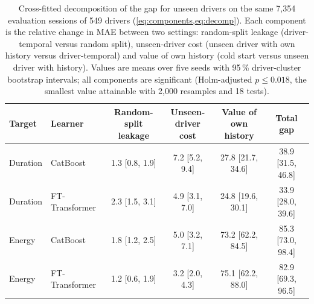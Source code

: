 \begin{table}[!tbp]
\centering\footnotesize
\caption{Cross-fitted decomposition of the gap for unseen drivers on the same 7,354 evaluation sessions of 549 drivers (\cref{eq:components,eq:decomp}). Each component is the relative change in MAE between two settings: random-split leakage (driver-temporal versus random split), unseen-driver cost (unseen driver with own history versus driver-temporal) and value of own history (cold start versus unseen driver with history). Values are means over five seeds with 95\,\% driver-cluster bootstrap intervals; all components are significant (Holm-adjusted $p\le0.018$, the smallest value attainable with 2,000 resamples and 18 tests).}
\label{tab:decomp}
\begin{adjustbox}{max width=\textwidth}
\begin{tabular}{llcccc}
\toprule
Target & Learner & \makecell{Random-split\\leakage} & \makecell{Unseen-driver\\cost} & \makecell{Value of\\own history} & Total gap \\
\midrule
Duration & CatBoost & 1.3 [0.8, 1.9] & 7.2 [5.2, 9.4] & 27.8 [21.7, 34.6] & 38.9 [31.5, 46.8] \\
Duration & FT-Transformer & 2.3 [1.5, 3.1] & 4.9 [3.1, 7.0] & 24.8 [19.6, 30.1] & 33.9 [28.0, 39.6] \\
Energy & CatBoost & 1.8 [1.2, 2.5] & 5.0 [3.2, 7.1] & 73.2 [62.2, 84.5] & 85.3 [73.0, 98.4] \\
Energy & FT-Transformer & 1.2 [0.6, 1.9] & 3.2 [2.0, 4.3] & 75.1 [62.2, 88.0] & 82.9 [69.3, 96.5] \\
\bottomrule
\end{tabular}
\end{adjustbox}
\end{table}
